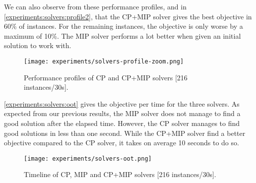 \documentclass[../../thesis.tex]{subfiles}
\begin{document}
We can also observe from these performance profiles, and in \autoref{experiments:solvers:profile2}, that 
the CP+MIP solver gives the best objective in 60\% of instances. For the remaining instances, the objective is only worse by a maximum of 10\%. 
The MIP solver performs a lot better when given an initial solution to work with.


\begin{figure}
  \centering
  \texttt{[image: experiments/solvers-profile-zoom.png]}
  \caption{Performance profiles of CP and CP+MIP solvers [216 instances/30s].}
  \label{experiments:solvers:profile2}
\end{figure}



\autoref{experiments:solvers:oot} gives the objective per time for the three solvers. As expected from our previous results, the MIP solver does not 
manage to find a good solution after the elapsed time. 
However, the CP solver manages to find good solutions in less than one second. While the CP+MIP solver find a 
better objective compared to the CP solver, it takes on average 10 seconds to do so.


\begin{figure}
  \centering
  \texttt{[image: experiments/solvers-oot.png]}
  \caption{Timeline of CP, MIP and CP+MIP solvers [216 instances/30s].}
  \label{experiments:solvers:oot}
\end{figure}
\end{document}
